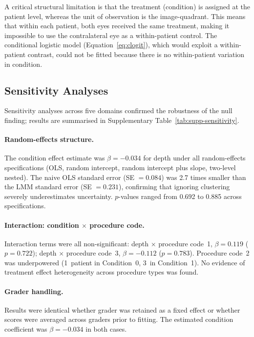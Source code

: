 A critical structural limitation is that the treatment (condition) is assigned at the patient level, whereas the unit of observation is the image-quadrant. This means that within each patient, both eyes received the same treatment, making it impossible to use the contralateral eye as a within-patient control. The conditional logistic model (Equation~\ref{eq:clogit}), which would exploit a within-patient contrast, could not be fitted because there is no within-patient variation in condition.

\subsection{Sensitivity Analyses}

Sensitivity analyses across five domains confirmed the robustness of the null finding; results are summarised in Supplementary Table~\ref{tab:supp-sensitivity}.

\paragraph{Random-effects structure.} The condition effect estimate was $\beta = -0.034$ for depth under all random-effects specifications (OLS, random intercept, random intercept plus slope, two-level nested). The naive OLS standard error (SE $= 0.084$) was 2.7 times smaller than the LMM standard error (SE $= 0.231$), confirming that ignoring clustering severely underestimates uncertainty. $p$-values ranged from 0.692 to 0.885 across specifications.

\paragraph{Interaction: condition $\times$ procedure code.} Interaction terms were all non-significant: depth $\times$ procedure code~1, $\beta = 0.119$ ($p = 0.722$); depth $\times$ procedure code~3, $\beta = -0.112$ ($p = 0.783$). Procedure code~2 was underpowered (1~patient in Condition~0, 3~in Condition~1). No evidence of treatment effect heterogeneity across procedure types was found.

\paragraph{Grader handling.} Results were identical whether grader was retained as a fixed effect or whether scores were averaged across graders prior to fitting. The estimated condition coefficient was $\beta = -0.034$ in both cases.

